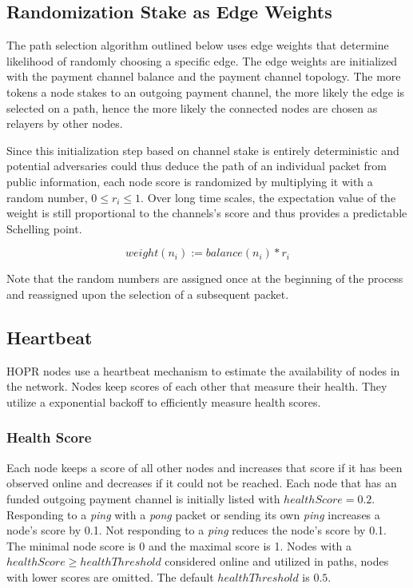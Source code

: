 \subsection{Randomization Stake as Edge Weights}
The path selection algorithm outlined below uses edge weights that determine likelihood of randomly choosing a specific edge. The edge weights are initialized with the payment channel balance and the payment channel topology. The more tokens a node stakes to an outgoing payment channel, the more likely the edge is selected on a path, hence the more likely the connected nodes are chosen as relayers by other nodes.

Since this initialization step based on channel stake is entirely deterministic and potential adversaries could thus deduce the path of an individual packet from public information, each node score is randomized by multiplying it with a random number, $0 \le r_i \le 1$. Over long time scales, the expectation value of the weight is still proportional to the channels's score and thus provides a predictable Schelling point.

$$ weight(n_i) := balance(n_i) * r_i$$

Note that the random numbers are assigned once at the beginning of the process and reassigned upon the selection of a subsequent packet.


\subsection{Heartbeat}
HOPR nodes use a heartbeat mechanism to estimate the availability of nodes in the network. Nodes keep scores of each other that measure their health. They utilize a exponential backoff to efficiently measure health scores.

\subsubsection{Health Score}
Each node keeps a score of all other nodes and increases that score if it has been observed online and decreases if it could not be reached. Each node that has an funded outgoing payment channel is initially listed with $healthScore = 0.2$. Responding to a \textit{ping} with a \textit{pong} packet or sending its own \textit{ping} increases a node's score by 0.1. Not responding to a \textit{ping} reduces the node's score by 0.1. The minimal node score is 0 and the maximal score is 1. Nodes with a $healthScore \ge healthThreshold$ considered online and utilized in paths, nodes with lower scores are omitted. The default $healthThreshold$ is $0.5$.

